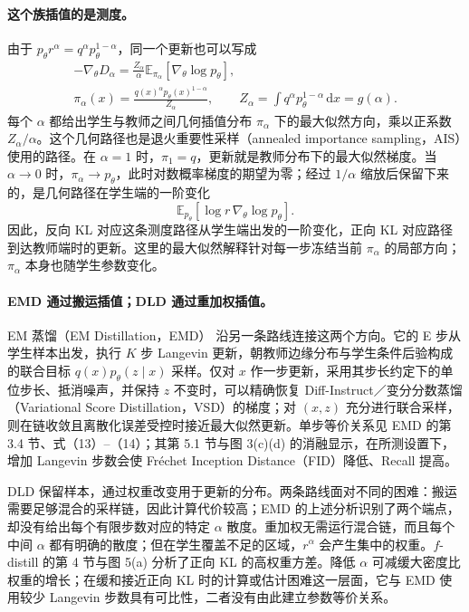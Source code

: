 \documentclass[UTF8,fontset=none,11pt,a4paper]{ctexart}
\newcommand{\E}{\mathbb E}
\newcommand{\dd}{\,\mathrm d}
\begin{document}
\paragraph{这个族插值的是测度。}
由于 $p_\theta r^\alpha=q^\alpha p_\theta^{1-\alpha}$，同一个更新也可以写成
\begin{equation}
\begin{gathered}
-\nabla_\theta D_\alpha
=\frac{Z_\alpha}{\alpha}\E_{\pi_\alpha}[\nabla_\theta\log p_\theta],\\
\pi_\alpha(x)=\frac{q(x)^\alpha p_\theta(x)^{1-\alpha}}{Z_\alpha},
\qquad
Z_\alpha=\int q^\alpha p_\theta^{1-\alpha}\dd x=g(\alpha).
\end{gathered}
\label{eq:bridge}
\end{equation}
每个 $\alpha$ 都给出学生与教师之间几何插值分布 $\pi_\alpha$ 下的最大似然方向，乘以正系数 $Z_\alpha/\alpha$。这个几何路径也是退火重要性采样（annealed importance sampling，AIS）使用的路径\cite{neal2001}。在 $\alpha=1$ 时，$\pi_1=q$，更新就是教师分布下的最大似然梯度。当 $\alpha\to0$ 时，$\pi_\alpha\to p_\theta$，此时对数概率梯度的期望为零；经过 $1/\alpha$ 缩放后保留下来的，是几何路径在学生端的一阶变化
\[
\E_{p_\theta}[\log r\,\nabla_\theta\log p_\theta].
\]
因此，反向 KL 对应这条测度路径从学生端出发的一阶变化，正向 KL 对应路径到达教师端时的更新。这里的最大似然解释针对每一步冻结当前 $\pi_\alpha$ 的局部方向；$\pi_\alpha$ 本身也随学生参数变化。

\paragraph{EMD 通过搬运插值；DLD 通过重加权插值。}
EM 蒸馏（EM Distillation，EMD）\cite{xie2024} 沿另一条路线连接这两个方向。它的 E 步从学生样本出发，执行 $K$ 步 Langevin 更新，朝教师边缘分布与学生条件后验构成的联合目标 $q(x)p_\theta(z\mid x)$ 采样。仅对 $x$ 作一步更新，采用其步长约定下的单位步长、抵消噪声，并保持 $z$ 不变时，可以精确恢复 Diff-Instruct／变分分数蒸馏（Variational Score Distillation，VSD）的梯度；对 $(x,z)$ 充分进行联合采样，则在链收敛且离散化误差受控时接近最大似然更新。单步等价关系见 EMD 的第 3.4 节、式（13）--（14）；其第 5.1 节与图 3(c)(d) 的消融显示，在所测设置下，增加 Langevin 步数会使 Fr\'echet Inception Distance（FID）降低、Recall 提高。

DLD 保留样本，通过权重改变用于更新的分布。两条路线面对不同的困难：搬运需要足够混合的采样链，因此计算代价较高；EMD 的上述分析识别了两个端点，却没有给出每个有限步数对应的特定 $\alpha$ 散度。重加权无需运行混合链，而且每个中间 $\alpha$ 都有明确的散度；但在学生覆盖不足的区域，$r^\alpha$ 会产生集中的权重。$f$-distill\cite{xu2025} 的第 4 节与图 5(a) 分析了正向 KL 的高权重方差。降低 $\alpha$ 可减缓大密度比权重的增长；在缓和接近正向 KL 时的计算或估计困难这一层面，它与 EMD 使用较少 Langevin 步数具有可比性，二者没有由此建立参数等价关系。
\end{document}
